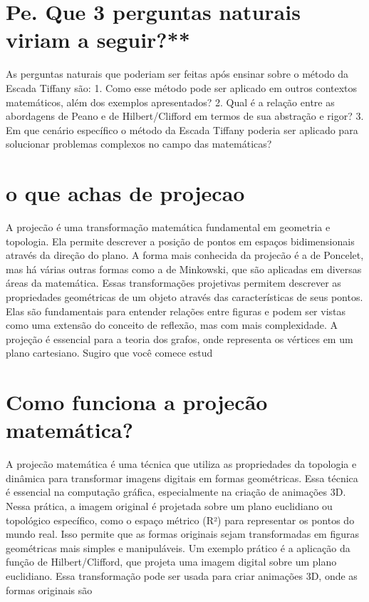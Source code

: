 \documentclass[11pt,a4paper]{article}
\begin{document}
\section{Pe. Que 3 perguntas naturais viriam a seguir?**}
As perguntas naturais que poderiam ser feitas após ensinar sobre o método da Escada Tiffany são: 1. Como esse método pode ser aplicado em outros contextos matemáticos, além dos exemplos apresentados? 2. Qual é a relação entre as abordagens de Peano e de Hilbert/Clifford em termos de sua abstração e rigor? 3. Em que cenário específico o método da Escada Tiffany poderia ser aplicado para solucionar problemas complexos no campo das matemáticas?

\section{o que achas de projecao}
A projecão é uma transformação matemática fundamental em geometria e topologia. Ela permite descrever a posição de pontos em espaços bidimensionais através da direção do plano. A forma mais conhecida da projecão é a de Poncelet, mas há várias outras formas como a de Minkowski, que são aplicadas em diversas áreas da matemática. Essas transformações projetivas permitem descrever as propriedades geométricas de um objeto através das características de seus pontos. Elas são fundamentais para entender relações entre figuras e podem ser vistas como uma extensão do conceito de reflexão, mas com mais complexidade. A projeção é essencial para a teoria dos grafos, onde representa os vértices em um plano cartesiano. Sugiro que você comece estud

\section{Como funciona a projecão matemática?}
A projecão matemática é uma técnica que utiliza as propriedades da topologia e dinâmica para transformar imagens digitais em formas geométricas. Essa técnica é essencial na computação gráfica, especialmente na criação de animações 3D. Nessa prática, a imagem original é projetada sobre um plano euclidiano ou topológico específico, como o espaço métrico (R²) para representar os pontos do mundo real. Isso permite que as formas originais sejam transformadas em figuras geométricas mais simples e manipuláveis. Um exemplo prático é a aplicação da função de Hilbert/Clifford, que projeta uma imagem digital sobre um plano euclidiano. Essa transformação pode ser usada para criar animações 3D, onde as formas originais são
\end{document}
